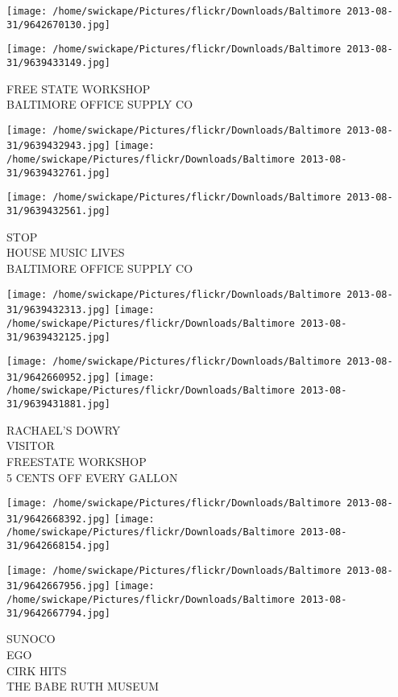 \documentclass[10pt,letterpaper]{article}
\begin{document}
\texttt{[image: /home/swickape/Pictures/flickr/Downloads/Baltimore 2013-08-31/9642670130.jpg]}

\vspace{0.25in}
\texttt{[image: /home/swickape/Pictures/flickr/Downloads/Baltimore 2013-08-31/9639433149.jpg]}

FREE STATE WORKSHOP\\
BALTIMORE OFFICE SUPPLY CO\\
\pagebreak

\texttt{[image: /home/swickape/Pictures/flickr/Downloads/Baltimore 2013-08-31/9639432943.jpg]}
\texttt{[image: /home/swickape/Pictures/flickr/Downloads/Baltimore 2013-08-31/9639432761.jpg]}

\vspace{0.25in}
\texttt{[image: /home/swickape/Pictures/flickr/Downloads/Baltimore 2013-08-31/9639432561.jpg]}

STOP\\
HOUSE MUSIC LIVES\\
BALTIMORE OFFICE SUPPLY CO\\
\pagebreak

\texttt{[image: /home/swickape/Pictures/flickr/Downloads/Baltimore 2013-08-31/9639432313.jpg]}
\texttt{[image: /home/swickape/Pictures/flickr/Downloads/Baltimore 2013-08-31/9639432125.jpg]}

\texttt{[image: /home/swickape/Pictures/flickr/Downloads/Baltimore 2013-08-31/9642660952.jpg]}
\texttt{[image: /home/swickape/Pictures/flickr/Downloads/Baltimore 2013-08-31/9639431881.jpg]}

RACHAEL'S DOWRY\\
VISITOR\\
FREESTATE WORKSHOP\\
5 CENTS OFF EVERY GALLON\\
\pagebreak

\texttt{[image: /home/swickape/Pictures/flickr/Downloads/Baltimore 2013-08-31/9642668392.jpg]}
\texttt{[image: /home/swickape/Pictures/flickr/Downloads/Baltimore 2013-08-31/9642668154.jpg]}

\texttt{[image: /home/swickape/Pictures/flickr/Downloads/Baltimore 2013-08-31/9642667956.jpg]}
\texttt{[image: /home/swickape/Pictures/flickr/Downloads/Baltimore 2013-08-31/9642667794.jpg]}

SUNOCO\\
EGO\\
CIRK HITS\\
THE BABE RUTH MUSEUM\\
\pagebreak
\end{document}
